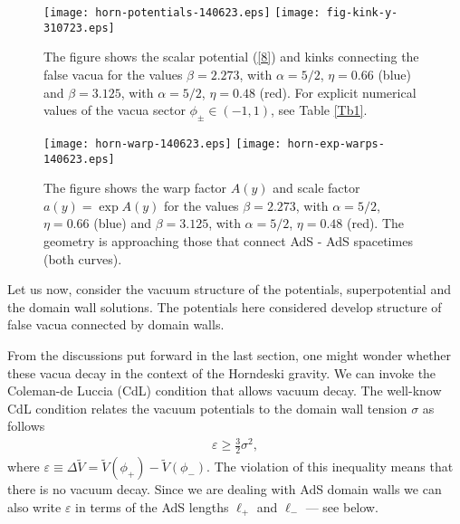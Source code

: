 \documentclass[aps,12pt, a4paper,nofootinbib]{revtex4}
\begin{document}
{\begin{figure}[!ht]
\begin{center}
\texttt{[image: horn-potentials-140623.eps]}\qquad\qquad\qquad
\texttt{[image: fig-kink-y-310723.eps]}
\caption{The figure shows the scalar potential (\ref{8}) and kinks connecting the false vacua for the values $\beta=2.273$, with $\alpha=5/2$, $\eta=0.66$ (blue) and $\beta=3.125$, with $\alpha=5/2$, $\eta=0.48$ (red). For explicit numerical values of the vacua sector $\phi_\pm \in (-1,1)$, see Table \ref{Tb1}.}
\label{p0-1}
\end{center}
\end{figure}


\begin{figure}[!ht]
\begin{center}
\texttt{[image: horn-warp-140623.eps]}\qquad\qquad\qquad
\texttt{[image: horn-exp-warps-140623.eps]}
\caption{The figure shows the warp factor $A(y)$ and scale factor $a(y)=\exp{A(y)}$ for the values $\beta=2.273$, with $\alpha=5/2$, $\eta=0.66$ (blue) and $\beta=3.125$, with $\alpha=5/2$, $\eta=0.48$ (red). The geometry is approaching those that connect AdS - AdS spacetimes (both curves). }
\label{p0-2}
\end{center}
\end{figure}


Let us now, consider the vacuum structure of the potentials, superpotential and the domain wall solutions. The potentials here considered develop structure of false vacua connected by domain walls.

From the discussions put forward in the last section, one might wonder whether these vacua decay in the context of the Horndeski gravity. We can invoke the Coleman-de Luccia (CdL) condition that allows vacuum decay. The well-know CdL condition relates the vacuum potentials to the domain wall tension $\sigma$ as follows \cite{Coleman:1980aw}
\begin{eqnarray}\label{CdL}
\varepsilon\geq\frac32\sigma^2,
\end{eqnarray}
where $\varepsilon\equiv\Delta \tilde{V}=\tilde{V}(\phi_+)-\tilde{V}(\phi_-)$. The violation of this inequality means that there is no vacuum decay.  Since we are dealing with AdS domain walls we can also write $\varepsilon$ in terms of the AdS lengths $\ell_+$ and $\ell_-$ --- see below.

}
\end{document}
